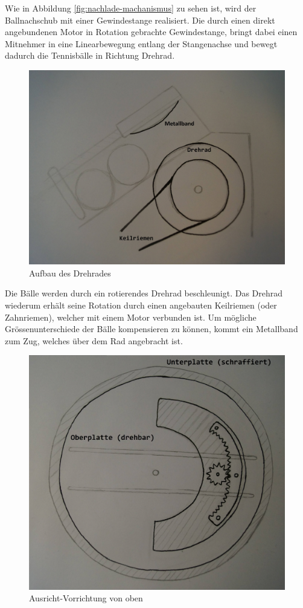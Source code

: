 Wie in Abbildung \ref{fig:nachlade-machanismus} zu sehen ist, wird der Ballnachschub mit einer Gewindestange realisiert. Die durch einen direkt angebundenen Motor in Rotation gebrachte Gewindestange, bringt dabei einen Mitnehmer in eine Linearbewegung entlang der Stangenachse und bewegt dadurch die Tennisbälle in Richtung Drehrad.

\begin{figure}[h!]
	\centering
	\includegraphics[scale=0.35]{../../fig/Drehrad.jpg}
	\caption{Aufbau des Drehrades}
\end{figure}

Die Bälle werden durch ein rotierendes Drehrad beschleunigt. Das Drehrad wiederum erhält seine Rotation durch einen angebauten Keilriemen (oder Zahnriemen), welcher mit einem Motor verbunden ist. Um mögliche Grössenunterschiede der Bälle kompensieren zu können, kommt ein Metallband zum Zug, welches über dem Rad angebracht ist.

\newpage

\begin{figure}[h!]
	\centering
	\includegraphics[scale=0.35]{../../fig/Ausrichtvorrichtung_Oben.jpg}
	\caption{Ausricht-Vorrichtung von oben}
\end{figure}

